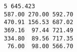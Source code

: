 \begin{verbatim}
5 645.423 
587.00 270.00 592.70 
470.91 156.53 687.02 
369.16  97.44 721.49 
334.80  89.56 717.35 
 76.00  98.00 566.70 



\end{verbatim}
